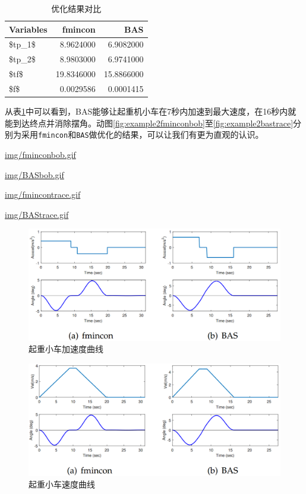 \documentclass[]{ctexbook}
\theoremstyle{definition}
\theoremstyle{definition}
\theoremstyle{definition}
\theoremstyle{remark}
\begin{document}
\begin{table}

\caption{\label{tab:example2result}优化结果对比}
\centering
\begin{tabular}[t]{lrr}
\toprule
Variables & fmincon & BAS\\
\midrule
\$tp\_1\$ & 8.9624000 & 6.9082000\\
\$tp\_2\$ & 8.9803000 & 6.9741000\\
\$tf\$ & 19.8346000 & 15.8866000\\
\$f\$ & 0.0029586 & 0.0001415\\
\bottomrule
\end{tabular}
\end{table}

从表\ref{tab:example2result}中可以看到，BAS能够让起重机小车在7秒内加速到最大速度，在16秒内就能到达终点并消除摆角。动图\ref{fig:example2fminconbob}至\ref{fig:example2bastrace}分别为采用\texttt{fmincon}和\texttt{BAS}做优化的结果，可以让我们有更为直观的认识。

\url{img/fminconbob.gif}

\url{img/BASbob.gif}

\url{img/fmincontrace.gif}

\url{img/BAStrace.gif}

\begin{figure}

{\centering \includegraphics[width=0.7\linewidth]{img/ex2_1} 

}

\caption{起重小车加速度曲线}\label{fig:ex2accel}
\end{figure}

\begin{figure}

{\centering \includegraphics[width=0.7\linewidth]{img/ex2_2} 

}

\caption{起重小车速度曲线}\label{fig:ex2velocity}
\end{figure}
\end{document}
